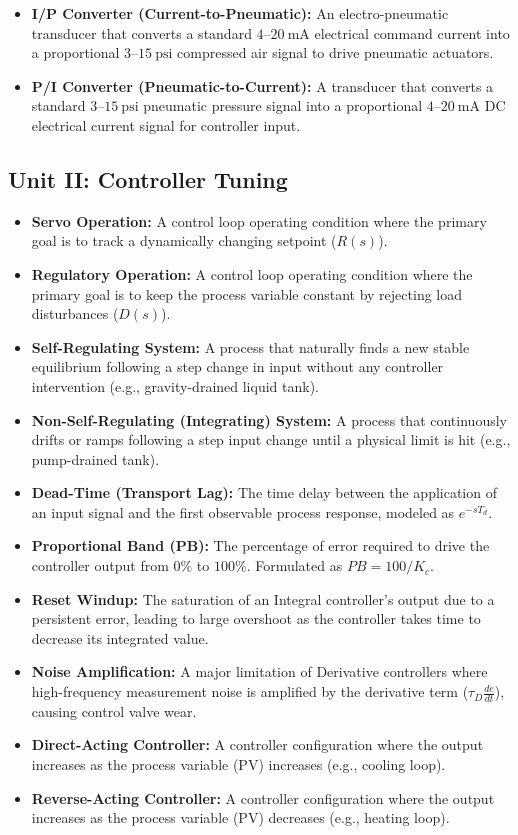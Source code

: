 \begin{itemize}
  \item \textbf{I/P Converter (Current-to-Pneumatic):} An electro-pneumatic transducer that converts a standard $4\text{--}20\ \text{mA}$ electrical command current into a proportional $3\text{--}15\ \text{psi}$ compressed air signal to drive pneumatic actuators.
  \item \textbf{P/I Converter (Pneumatic-to-Current):} A transducer that converts a standard $3\text{--}15\ \text{psi}$ pneumatic pressure signal into a proportional $4\text{--}20\ \text{mA}$ DC electrical current signal for controller input.
\end{itemize}

\subsection{Unit II: Controller Tuning}
\begin{itemize}
  \item \textbf{Servo Operation:} A control loop operating condition where the primary goal is to track a dynamically changing setpoint ($R(s)$).
  \item \textbf{Regulatory Operation:} A control loop operating condition where the primary goal is to keep the process variable constant by rejecting load disturbances ($D(s)$).
  \item \textbf{Self-Regulating System:} A process that naturally finds a new stable equilibrium following a step change in input without any controller intervention (e.g., gravity-drained liquid tank).
  \item \textbf{Non-Self-Regulating (Integrating) System:} A process that continuously drifts or ramps following a step input change until a physical limit is hit (e.g., pump-drained tank).
  \item \textbf{Dead-Time (Transport Lag):} The time delay between the application of an input signal and the first observable process response, modeled as $e^{-s T_d}$.
  \item \textbf{Proportional Band (PB):} The percentage of error required to drive the controller output from $0\%$ to $100\%$. Formulated as $PB = 100/K_c$.
  \item \textbf{Reset Windup:} The saturation of an Integral controller's output due to a persistent error, leading to large overshoot as the controller takes time to decrease its integrated value.
  \item \textbf{Noise Amplification:} A major limitation of Derivative controllers where high-frequency measurement noise is amplified by the derivative term ($\tau_D \frac{de}{dt}$), causing control valve wear.
  \item \textbf{Direct-Acting Controller:} A controller configuration where the output increases as the process variable (PV) increases (e.g., cooling loop).
  \item \textbf{Reverse-Acting Controller:} A controller configuration where the output increases as the process variable (PV) decreases (e.g., heating loop).
\end{itemize}

